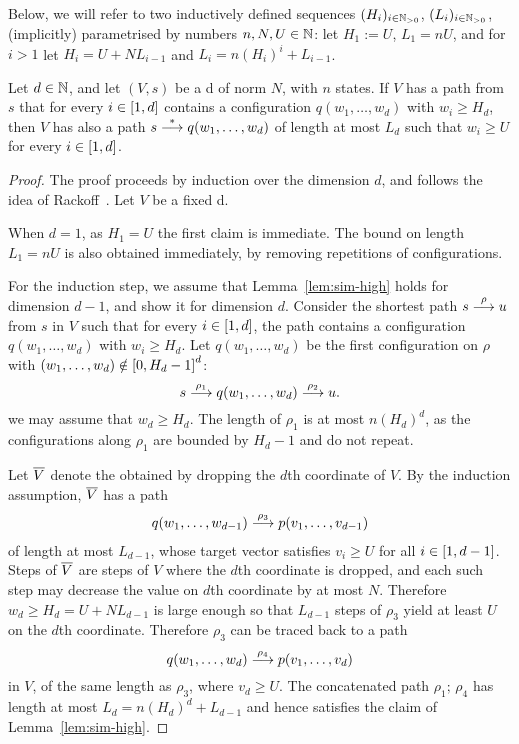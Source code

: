 \begin{appendixproof}
Below, we will refer to two inductively defined sequences $(H_i)_{i\in\mathbb{N}_{>0}}$, $(L_i)_{i\in\mathbb{N}_{>0}}$,
(implicitly) parametrised
by numbers $n, N, U \in \mathbb{N}$:
let $H_1 := U$, $L_1 = n U$, and for  $i > 1$ let $H_i = U + N L_{i-1}$ and  
$L_i = n (H_i)^i + L_{i-1}$.

\begin{lemma}\label{lem:sim-high}
Let $d \in \mathbb{N}$, and let $(V, s)$ be a \parvass d of norm $N$, with $n$ states.
If $V$ has a path from $s$ that for every $i\in[1, d]$ contains a configuration 
$q(w_1, \ldots, w_d)$ with $w_i \geq H_d$,
then $V$ has also a path $s \stackrel{*}{\longrightarrow} q(w_1, \ldots, w_d)$ of length at most $L_d$
such that $w_i \geq U$ for every $i\in[1, d]$.
\end{lemma}


\begin{proof}%
The proof proceeds by induction over the dimension $d$, and 
follows the idea of Rackoff~\cite[Lemma 3.4]{DBLP:journals/tcs/Rackoff78}.
Let $V$ be a fixed \parvass d.

When $d = 1$, as $H_1 = U$ the first claim is immediate.
The bound on length $L_1 = n U$ is also obtained immediately, by removing repetitions of
configurations.

For the induction step, we assume that Lemma~\ref{lem:sim-high} holds for dimension $d-1$,
and show it for dimension $d$.
Consider the  shortest 
path $s\stackrel{\rho}{\longrightarrow} u$ from $s$ in $V$ such that for every $i\in[1, d]$, the path contains a configuration 
$q(w_{1}, \ldots, w_{d})$ with $w_{i} \geq H_d$.
Let $q(w_1, \ldots, w_d)$ be the first  configuration  on $\rho$ with
$(w_1, \ldots, w_d) \notin {[0, H_d-1]}^d$:
\[
s \stackrel{\rho_1}{\longrightarrow} q(w_1, \ldots, w_d) \stackrel{\rho_2}{\longrightarrow} u.
\]
\Wlog we may assume that $w_d \geq H_d$. 
The length of $\rho_1$ is at most $n (H_d)^d$, as the 
configurations along $\rho_1$ are bounded by $H_d -1$ and do not repeat.

Let $\overline{V}$ denote the  obtained by dropping the $d$th coordinate of $V$.
By the induction assumption, $\overline{V}$ has a path 
\begin{align*}%
q(w_1, \ldots, w_{d-1}) \trans{\rho_3} p(v_1, \ldots, v_{d-1})
\end{align*}
of length at most $L_{d-1}$, whose target vector satisfies $v_i \geq U$ for all $i\in[1, d-1]$.
Steps of $\overline{V}$ are steps of $V$ where the $d$th coordinate is dropped,
and each such step may decrease the value on $d$th coordinate by at most $N$.
Therefore $w_d\geq H_d=U+N L_{d-1}$ is large enough so that $L_{d-1}$ steps of 
$\rho_3$ yield at least $U$ on the $d$th coordinate.
Therefore $\rho_3$  can be traced back to a path 
\[
q(w_1, \ldots, w_{d}) \stackrel{\rho_4}{\longrightarrow} p(v_1, \ldots, v_{d})
\]
in $V$, of the same length as $\rho_3$, where $v_d\geq U$.
The concatenated path $\rho_1; \, \rho_4$ has length at most
$L_d = n (H_d)^d + L_{d-1}$ and hence satisfies the claim of Lemma~\ref{lem:sim-high}.
\end{proof}


\end{appendixproof}

